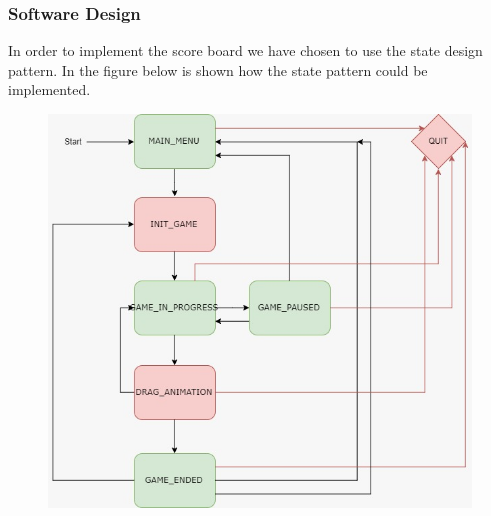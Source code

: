 \documentclass{article}
\begin{document}
\subsubsection{Software Design}
In order to implement the score board we have chosen to use the state design pattern. In the figure below is shown how the state pattern could be implemented.

\begin{figure}[H]
\includegraphics[scale=0.55]{Images/GameStatesBasic.jpeg}
\end{figure}
\end{document}
